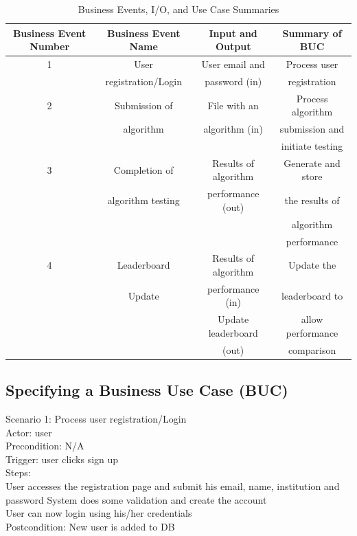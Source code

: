 \documentclass[12pt]{article}
\begin{document}
\begin{table}[H]
    \centering
    \begin{tabular}{| c | c | c | c |}
    \hline
         Business Event Number & Business Event Name & Input and Output & Summary of BUC \\
    \hline
         1 & User & User email and & Process user \\
         & registration/Login & password (in) & registration \\
        \hline
         2 & Submission of & File with an & Process algorithm \\
          & algorithm & algorithm (in) & submission and \\
          & & & initiate testing \\
         \hline
         3 & Completion of & Results of algorithm & Generate and store \\
         & algorithm testing & performance (out) & the results of \\
         & & & algorithm \\
         & & & performance \\
         \hline
         4 & Leaderboard & Results of algorithm & Update the \\
          & Update & performance (in) & leaderboard to \\
          & & Update leaderboard & allow performance \\
          & & (out) & comparison\\
 \hline
    \end{tabular}
    \caption{Business Events, I/O, and Use Case Summaries}
\end{table}


\subsection{Specifying a Business Use Case (BUC)}
        Scenario 1: Process user registration/Login \\
	Actor: user \\
	Precondition: N/A \\
	Trigger: user clicks sign up \\
	Steps: \\
User accesses the registration page and submit his email, name, institution and password
System does some validation and create the account \\
User can now login using his/her credentials \\
	Postcondition: New user is added to DB \\
\end{document}

